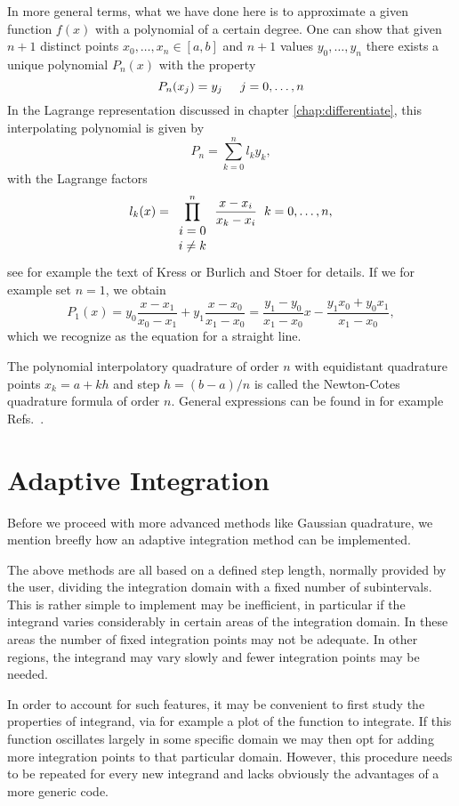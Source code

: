 In more general terms, what we have done here is to approximate a given function $f(x)$ with a polynomial
of a certain degree. One can show that 
given $n+1$ distinct points $x_0,\dots, x_n\in[a,b]$ and $n+1$ values $y_0,\dots,y_n$ there exists a 
unique polynomial $P_n(x)$ with the property 
\[
   P_n(x_j) = y_j\hspace{0.5cm} j=0,\dots,n
\]
In the Lagrange representation discussed in chapter \ref{chap:differentiate}, this interpolating polynomial is given by
\[
P_n = \sum_{k=0}^nl_ky_k,
\]
with the Lagrange factors
\[
   l_k(x) = \prod_{\begin{array}{c}i=0 \\ i\ne k\end{array}}^n\frac{x-x_i}{x_k-x_i}\hspace{0.2cm} k=0,\dots,n,
\]
see for example the text of Kress \cite{kress} or Burlich and Stoer \cite{st1983} for details.
If we for example set $n=1$, we obtain
\[
P_1(x) = y_0\frac{x-x_1}{x_0-x_1}+y_1\frac{x-x_0}{x_1-x_0}=\frac{y_1-y_0}{x_1-x_0}x-\frac{y_1x_0+y_0x_1}{x_1-x_0},
\]
which we recognize as the equation for a straight line.

The polynomial interpolatory quadrature of order $n$ with equidistant quadrature points $x_k=a+kh$
and step $h=(b-a)/n$ is called the Newton-Cotes quadrature formula of order $n$.
General expressions can be found in for example Refs.~\cite{kress,st1983}.

\section{Adaptive Integration}
Before we proceed with more advanced methods like Gaussian quadrature, we mention breefly how
an adaptive integration method can be implemented.

The above methods are all based on a defined step length, normally provided by the user,
dividing the integration domain with a fixed number of subintervals.
This is rather simple to implement may be inefficient, in particular if the integrand
varies considerably in certain areas of the integration domain. In these areas the number of fixed integration points may not be adequate. In other regions, the integrand may vary slowly
and fewer integration points may be needed.

In order to account for such features, it may be convenient to first study the properties of
integrand, via for example a plot of the function to integrate. If this function
oscillates largely in some specific domain we may then opt for adding more integration points
to that particular domain. However, this procedure needs to be repeated for every new integrand and lacks obviously the advantages of a more generic code.  

